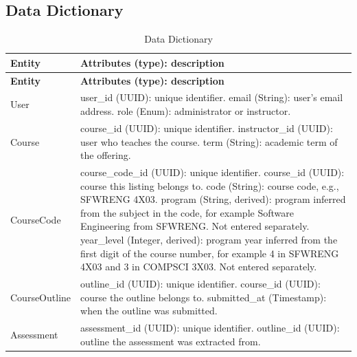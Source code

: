 \documentclass[12pt]{article}
\begin{document}
\subsection{Data Dictionary}

{\small
\renewcommand{\arraystretch}{1.2}
\begin{longtable}{>{\raggedright\arraybackslash}p{} >{\raggedright\arraybackslash}p{}}
\toprule
\textbf{Entity} & \textbf{Attributes (type): description} \\
\midrule
\endfirsthead
\toprule
\textbf{Entity} & \textbf{Attributes (type): description} \\
\midrule
\endhead
\endfoot
\bottomrule
\caption{Data Dictionary} \label{tab:data-dictionary}
\endlastfoot
User &
user\_id (UUID): unique identifier. \newline
email (String): user's email address. \newline
role (Enum): administrator or instructor. \\ \addlinespace
Course &
course\_id (UUID): unique identifier. \newline
instructor\_id (UUID): user who teaches the course. \newline
term (String): academic term of the offering. \\ \addlinespace
CourseCode &
course\_code\_id (UUID): unique identifier. \newline
course\_id (UUID): course this listing belongs to. \newline
code (String): course code, e.g., SFWRENG 4X03. \newline
program (String, derived): program inferred from the subject in the code, for example Software Engineering from SFWRENG. Not entered separately. \newline
year\_level (Integer, derived): program year inferred from the first digit of the course number, for example 4 in SFWRENG 4X03 and 3 in COMPSCI 3X03. Not entered separately. \\ \addlinespace
CourseOutline &
outline\_id (UUID): unique identifier. \newline
course\_id (UUID): course the outline belongs to. \newline
submitted\_at (Timestamp): when the outline was submitted. \\ \addlinespace
Assessment &
assessment\_id (UUID): unique identifier. \newline
outline\_id (UUID): outline the assessment was extracted from. \newline

\end{longtable}}
\end{document}

